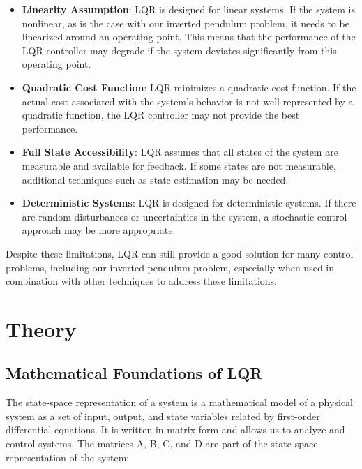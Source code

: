 \documentclass[11pt,twocolumn,twoside,lineno]{pnas-new}
\begin{document}
\begin{itemize}
    \item \textbf{Linearity Assumption}: LQR is designed for linear systems. If the system is nonlinear, as is the case with our inverted pendulum problem, it needs to be linearized around an operating point. This means that the performance of the LQR controller may degrade if the system deviates significantly from this operating point.
    \item \textbf{Quadratic Cost Function}: LQR minimizes a quadratic cost function. If the actual cost associated with the system's behavior is not well-represented by a quadratic function, the LQR controller may not provide the best performance.
    \item \textbf{Full State Accessibility}: LQR assumes that all states of the system are measurable and available for feedback. If some states are not measurable, additional techniques such as state estimation may be needed.
    \item \textbf{Deterministic Systems}: LQR is designed for deterministic systems. If there are random disturbances or uncertainties in the system, a stochastic control approach may be more appropriate.
\end{itemize}

Despite these limitations, LQR can still provide a good solution for many control problems, including our inverted pendulum problem, especially when used in combination with other techniques to address these limitations.


\section{Theory}
\subsection{Mathematical Foundations of LQR}
The state-space representation of a system is a mathematical model of a physical system as a set of input, output, and state variables related by first-order differential equations. It is written in matrix form and allows us to analyze and control systems. The matrices A, B, C, and D are part of the state-space representation of the system:
\end{document}
